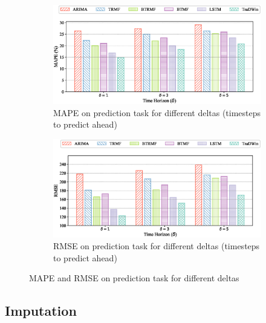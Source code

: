\begin{figure}[H]
    \centering
    \begin{subfigure}{1\textwidth}
        \centering
        \includegraphics[width=1\linewidth]{mape_pred.eps}
        \caption{MAPE on prediction task for different deltas (timesteps to predict ahead)}
        \label{fig:mape_pred}
    \end{subfigure}
    
    \begin{subfigure}{1\textwidth}
        \centering
        \includegraphics[width=1\linewidth]{rmse_pred.eps}
        \caption{RMSE on prediction task for different deltas (timesteps to predict ahead)}
        \label{fig:rmse_pred}
    \end{subfigure}
    \caption{MAPE and RMSE on prediction task for different deltas}
    \label{fig:pred_comparison}
\end{figure}

\subsection{Imputation}

